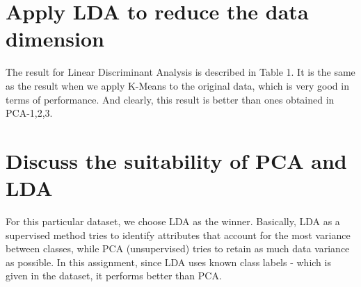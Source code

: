 \documentclass[a4paper]{article}
\begin{document}
\section{Apply LDA to reduce the data dimension}
The result for Linear Discriminant Analysis is described in Table 1. It is the same as the result when we apply K-Means to the original data, which is very good in terms of performance. And clearly, this result is better than ones obtained in  PCA-1,2,3.



\section{Discuss the suitability of PCA and LDA}
For this particular dataset, we choose LDA as the winner. Basically, LDA as a supervised method tries to identify attributes that account for the most variance between classes, while PCA (unsupervised) tries to retain as much data variance as possible. In this assignment, since LDA uses known class labels - which is given in the dataset, it performs better than PCA.
\end{document}
